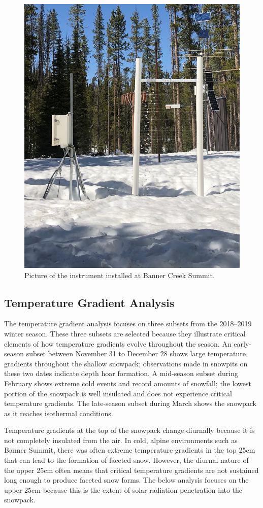  \begin{figure}[H]
    \centering
    \includegraphics[width=0.7\linewidth]{figures/Banner_Sensor.jpeg}
    \caption{Picture of the instrument installed at Banner Creek Summit.}
    \label{fig:Banner_Sensor}
 \end{figure}
 
\subsection{Temperature Gradient Analysis}
The temperature gradient analysis focuses on three subsets from the 2018--2019 winter season. These three subsets are selected because they illustrate critical elements of how temperature gradients evolve throughout the season. An early-season subset between November 31 to December 28 shows large temperature gradients throughout the shallow snowpack; observations made in snowpits on these two dates indicate depth hoar formation. A mid-season subset during February shows extreme cold events and record amounts of snowfall; the lowest portion of the snowpack is well insulated and does not experience critical temperature gradients. The late-season subset during March shows the snowpack as it reaches isothermal conditions.  

Temperature gradients at the top of the snowpack change diurnally because it is not completely insulated from the air. In cold, alpine environments such as Banner Summit, there was often extreme temperature gradients in the top 25cm that can lead to the formation of faceted snow. However, the diurnal nature of the upper 25cm often means that critical temperature gradients are not sustained long enough to produce faceted snow forms. The below analysis focuses on the upper 25cm because this is the extent of solar radiation penetration into the snowpack.  

